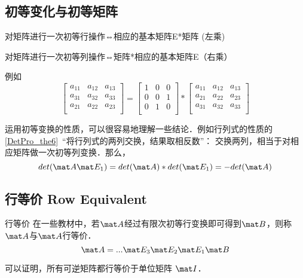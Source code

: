 \subsection{初等变化与初等矩阵}
\begin{theorem}{}
对矩阵进行一次初等行操作⇔相应的基本矩阵E*矩阵 (左乘)

对矩阵进行一次初等列操作⇔矩阵*相应的基本矩阵E（右乘）
\end{theorem}

\begin{example}{}
例如
\begin{equation}
\begin{bmatrix}
    a_{11} & a_{12} & a_{13}\\
    a_{31} & a_{32} & a_{33}\\
    a_{21} & a_{22} & a_{23}\\
\end{bmatrix}
=
    \begin{bmatrix}
        1 & 0 & 0\\
        0 & 0 & 1\\
        0 & 1 & 0\\
    \end{bmatrix}
*
\begin{bmatrix}
        a_{11} & a_{12} & a_{13}\\
        a_{21} & a_{22} & a_{23}\\
        a_{31} & a_{32} & a_{33}\\
\end{bmatrix}
\end{equation}
\end{example}

运用初等变换的性质，可以很容易地理解一些结论．例如行列式的性质的\autoref{DetPro_the6}~“将行列式的两列交换，结果取相反数”： 交换两列，相当于对相应矩阵做一次初等列变换．那么，
$$det (\mat A \mat E_1)=det (\mat A)*det(\mat E_1)=-det (\mat A)$$


\subsection{行等价 Row Equivalent}
\begin{definition}{行等价}
在一些教材中，若$\mat A$经过有限次初等行变换即可得到$\mat B$，则称$\mat A$与$\mat A$行等价．
\begin{equation}
\mat A= ... \mat E_3 \mat E_2 \mat E_1 \mat  B
\end{equation}
\end{definition}

可以证明，所有可逆矩阵都行等价于单位矩阵 $\mat I$．
